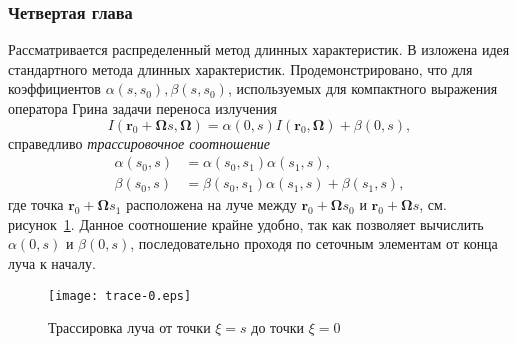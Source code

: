 \subsubsection*{Четвертая глава}
Рассматривается распределенный метод длинных характеристик. В  изложена идея стандартного метода длинных характеристик. 
Продемонстрировано, что для коэффициентов $\alpha(s, s_0), \beta(s, s_0)$, используемых для компактного выражения оператора Грина задачи переноса излучения
\[
I(\mathbf r_0 + \boldsymbol \Omega s, \boldsymbol \Omega) = 
\alpha(0, s) I(\mathbf r_0, \boldsymbol \Omega) + \beta(0, s),
\]
справедливо \emph{трассировочное соотношение}
\[\begin{aligned}
\alpha(s_0, s) &= \alpha(s_0, s_1) \alpha(s_1, s),\\
\beta(s_0, s) &= \beta(s_0, s_1) \alpha(s_1, s) + \beta(s_1, s),
\end{aligned}
\]
где точка $\mathbf r_0 + \boldsymbol \Omega s_1$ расположена на луче между $\mathbf r_0 + \boldsymbol \Omega s_0$ и $\mathbf r_0 + \boldsymbol \Omega s$, см. рисунок~\ref{fig:trace}. Данное соотношение крайне удобно, так как позволяет вычислить $\alpha(0, s)$ и $\beta(0, s)$, последовательно проходя по сеточным элементам от конца луча к началу.
\begin{figure}[ht!]
\centering
\texttt{[image: trace-0.eps]}
\caption{Трассировка луча от точки $\xi = s$ до точки $\xi = 0$}
\label{fig:trace}
\end{figure}

